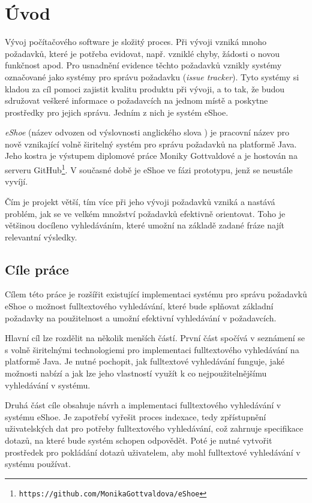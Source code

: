 \documentclass[11pt,oneside]{fithesis2}
\begin{document}
\chapter{Úvod}
\label{UvodChapter}
Vývoj počítačového software je složitý proces. Při vývoji vzniká mnoho požadavků, které je potřeba evidovat, např. vzniklé chyby, žádosti o novou funkčnost apod. Pro usnadnění evidence těchto požadavků vznikly systémy označované jako systémy pro správu požadavku (\emph{issue tracker}). Tyto systémy si kladou za cíl pomoci zajistit kvalitu produktu při vývoji, a to tak, že budou sdružovat veškeré informace o požadavcích na jednom místě a poskytne prostředky pro jejich správu.  Jedním z nich je systém eShoe.

\emph{eShoe} (název odvozen od výslovnosti anglického slova ) je pracovní název pro nově vznikající volně širitelný systém pro správu požadavků na platformě Java. Jeho kostra je výstupem diplomové práce Moniky Gottvaldové \cite{eShoeDiplomka} a je hostován na serveru GitHub\footnote{\texttt{https://github.com/MonikaGottvaldova/eShoe}}. V současné době je eShoe ve fázi prototypu, jenž se neustále vyvíjí. 

Čím je projekt větší, tím více při jeho vývoji požadavků vzniká a nastává problém, jak se ve velkém množství požadavků efektivně orientovat. Toho je většinou docíleno vyhledáváním, které umožní na základě zadané fráze najít relevantní výsledky. 

\section{Cíle práce}
\label{CilePrace}
Cílem této práce je rozšířit existující implementaci systému pro správu požadavků eShoe o možnost fulltextového vyhledávání, které bude splňovat základní požadavky na použitelnost a umožní efektivní vyhledávání v požadavcích. 

Hlavní cíl lze rozdělit na několik menších částí. První část spočívá v seznámení se s volně širitelnými technologiemi pro implementaci fulltextového vyhledávání na platformě Java. Je nutné pochopit, jak fulltextové vyhledávání funguje, jaké možnosti nabízí a jak lze jeho vlastností využít k co nejpoužitelnějšímu vyhledávání v systému.

Druhá část cíle obsahuje návrh a implementaci fulltextového vyhledávání v systému eShoe. Je zapotřebí vyřešit proces indexace, tedy zpřístupnění uživatelských dat pro potřeby fulltextového vyhledávání, což zahrnuje specifikace dotazů, na které bude systém schopen odpovědět. Poté je nutné vytvořit prostředek pro pokládání dotazů uživatelem, aby mohl fulltextové vyhledávání v systému používat.
\end{document}
